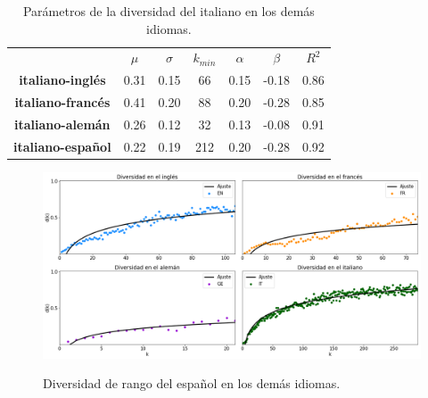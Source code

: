 \begin{table}[h!]
	\centering
	\begin{tabular}{ccccccc}
		\textbf{}                & \textbf{$\mu$} & \textbf{$\sigma$} & \textbf{$k_{min}$} & \textbf{$\alpha$} & \textbf{$\beta$} & \textbf{$R^{2}$} \\
		\textbf{italiano-inglés}  & 0.31          & 0.15                & 66                   & 0.15           & -0.18        & 0.86        \\
		\textbf{italiano-francés}   & 0.41           & 0.20                & 88                    & 0.20           & -0.28         & 0.85        \\
		\textbf{italiano-alemán} & 0.26           & 0.12                & 32                    & 0.13           & -0.08         & 0.91        \\
		\textbf{italiano-español}  & 0.22          & 0.19                & 212                    & 0.20           & -0.28         & 0.92       
	\end{tabular}
	\caption{Parámetros de la diversidad del italiano en los demás idiomas.}
	\label{tab.DR_IT}
\end{table}


\newpage

\begin{figure}[h!]
	\centering
	\includegraphics[width=1 \textwidth, scale = .38]{Cap_6/DR_SP.png}
	\label{fig.DR_SP}
	\caption{Diversidad de rango del español en los demás idiomas.}
\end{figure}


